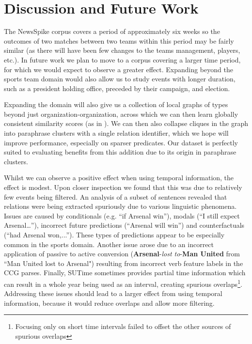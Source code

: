 \documentclass[11pt]{article}
\begin{document}
\section{Discussion and Future Work}
\label{sec:discussion}

The NewsSpike corpus covers a period of approximately six weeks so the outcomes of two matches between two teams within this period may be fairly similar (as there will have been few changes to the teams management, players, etc.). In future work we plan to move to a corpus covering a larger time period, for which we would expect to observe a greater effect. Expanding beyond the sports team domain would also allow us to study events with longer duration, such as a president holding office, preceded by their campaign, and election. 

Expanding the domain will also give us a collection of local graphs of types beyond just organization-organization, across which we can then learn globally consistent similarity scores (as in ). We can then also collapse cliques in the graph into paraphrase clusters with a single relation identifier, which we hope will improve performance, especially on sparser predicates. Our dataset is perfectly suited to evaluating benefits from this addition due to its origin in paraphrase clusters.

Whilst we can observe a positive effect when using temporal information, the effect is modest. Upon closer inspection we found that this was due to relatively few events being filtered. An analysis of a subset of sentences revealed that relations were being extracted spuriously due to various linguistic phenomena. Issues are caused by conditionals (e.g. ``if Arsenal win”), modals (``I still expect Arsenal…”), incorrect future predictions (``Arsenal will win”) and counterfactuals (``had Arsenal won,...”). These types of predictions appear to be especially common in the sports domain. Another issue arose due to an incorrect application of passive to active conversion (\textbf{Arsenal}-\textit{lost to}-\textbf{Man United} from ``Man United lost to Arsenal") resulting from incorrect verb feature labels in the CCG parses. Finally, SUTime sometimes provides partial time information which can result in a whole year being used as an interval, creating spurious overlaps\footnote{Focusing only on short time intervals failed to offset the other sources of spurious overlaps}. Addressing these issues should lead to a larger effect from using temporal information, because it would reduce overlaps and allow more filtering.
\end{document}
